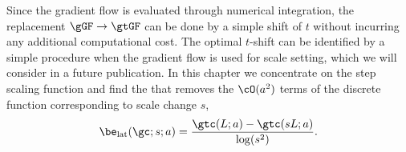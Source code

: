 Since the gradient flow is evaluated through numerical integration, the replacement $\gGF \to \gtGF$ can be done by a simple shift of $t$ without incurring any additional computational cost.
The optimal $t$-shift \topt can be identified by a simple procedure when the gradient flow is used for scale setting, which we will consider in a future publication.
In this chapter we concentrate on the step scaling function and find the \topt that removes the $\cO(a^2)$ terms of the discrete \be function corresponding to scale change $s$,
\begin{equation}
  \label{eq:beta_lat}
  \be_{\rm lat}(\gc; s; a) = \frac{\gtc(L; a) - \gtc(sL; a)}{\log(s^2)}.
\end{equation}
